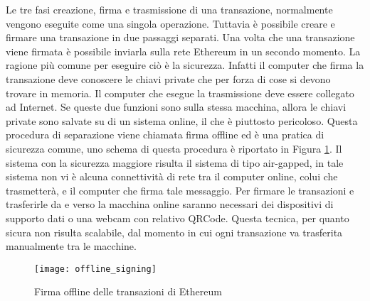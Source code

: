 Le tre fasi creazione, firma e trasmissione di una transazione, normalmente vengono eseguite come una singola operazione. Tuttavia è possibile creare e firmare una transazione in due passaggi separati. Una volta che una transazione viene firmata è possibile inviarla sulla rete Ethereum in un secondo momento. La ragione più comune per eseguire ciò è la sicurezza. Infatti il computer che firma la transazione deve conoscere le chiavi private che per forza di cose si devono trovare in memoria. Il computer che esegue la trasmissione deve essere collegato ad Internet. Se queste due funzioni sono sulla stessa macchina, allora le chiavi private sono salvate su di un sistema online, il che è piuttosto pericoloso. Questa procedura di separazione viene chiamata firma offline ed è una pratica di sicurezza comune, uno schema di questa procedura è riportato in Figura \ref{fig:ofline_signing}. Il sistema con la sicurezza maggiore risulta il sistema di tipo air-gapped, in tale sistema non vi è alcuna connettività di rete tra il computer online, colui che trasmetterà, e il computer che firma tale messaggio. Per firmare le transazioni e trasferirle da e verso la macchina online saranno necessari dei dispositivi di supporto dati o una webcam con relativo QRCode. Questa tecnica, per quanto sicura non risulta scalabile, dal momento in cui ogni transazione va trasferita manualmente tra le macchine.
\begin{figure}
	\centering 
	\texttt{[image: offline\_signing]} 
	\caption[Firma offline delle transazioni di Ethereum]{Firma offline delle transazioni di Ethereum}
	\label{fig:ofline_signing} 
\end{figure}

